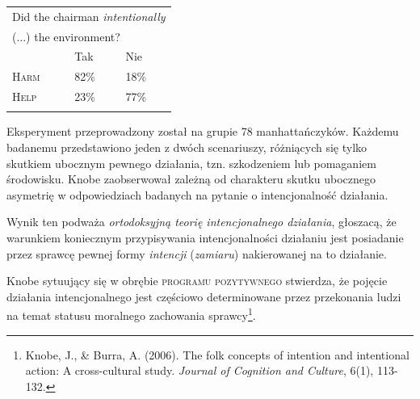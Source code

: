 \documentclass[a4paper]{tufte-handout}
\begin{document}

\begin{margintable}
	
	\begin{tabularx}{\textwidth} {lll}
		\multicolumn{3}{l}{Did the chairman \textit{intentionally}}  \\
		\multicolumn{3}{l}{(...) the environment?} \\
		& Tak & Nie \\
		\textsc{Harm} & 82\% & 18\% \\
		\textsc{Help} & 23\% & 77\% \\ &
	\end{tabularx}
\end{margintable}

Eksperyment przeprowadzony został na grupie 78 manhattańczyków. Każdemu badanemu przedstawiono jeden z dwóch scenariuszy, różniących się tylko skutkiem ubocznym pewnego działania, tzn. szkodzeniem lub pomaganiem środowisku. Knobe zaobserwował zależną od charakteru skutku ubocznego asymetrię w odpowiedziach badanych na pytanie o intencjonalność działania. 

Wynik ten podważa \textit{ortodoksyjną teorię intencjonalnego działania}, głoszacą, że warunkiem koniecznym przypisywania intencjonalności działaniu jest posiadanie przez sprawcę pewnej formy \textit{intencji} (\textit{zamiaru}) nakierowanej na to działanie.

Knobe sytuujący się w obrębie \textsc{programu pozytywnego} stwierdza, że pojęcie działania intencjonalnego jest częściowo determinowane przez przekonania ludzi na temat statusu moralnego zachowania sprawcy\footnote{Knobe, J., \& Burra, A. (2006). The folk concepts of intention and intentional action: A cross-cultural study. \textit{Journal of Cognition and Culture}, 6(1), 113-132.}.
\end{document}

